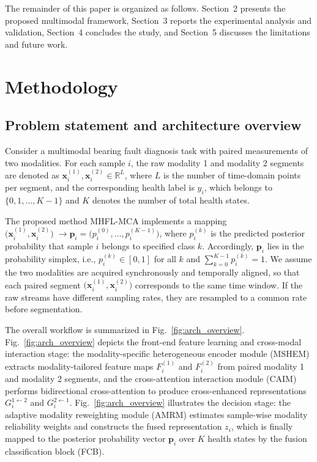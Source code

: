 \documentclass[a4paper]{cas-sc}
\begin{document}
The remainder of this paper is organized as follows.
Section~2 presents the proposed multimodal framework, Section~3 reports the experimental analysis and validation, Section~4 concludes the study, and Section~5 discusses the limitations and future work.

\section{Methodology}
\subsection{Problem statement and architecture overview}

Consider a multimodal bearing fault diagnosis task with paired measurements of two modalities. For each sample \(i\), the raw modality 1 and modality 2 segments are denoted as
$\mathbf{x}_i^{(1)}, \mathbf{x}_i^{(2)} \in \mathbb{R}^{L}$, 
where \(L\) is the number of time-domain points per segment, and the corresponding health label is $y_i$, which belongs to $\{0,1,\dots,K-1\}$ and $K$ denotes the number of total health states.

The proposed method MHFL-MCA implements a mapping
$\big(\mathbf{x}_i^{(1)}, \mathbf{x}_i^{(2)}\big) \;\rightarrow \mathbf{p}_i = \big(p_i^{(0)}, \dots, p_i^{(K-1)}\big)$, where \(p_i^{(k)}\) is the predicted posterior probability that sample \(i\) belongs to specified class \(k\). Accordingly, $\mathbf{p}_i$ lies in the probability simplex, i.e.,
$p_i^{(k)}\in[0,1]$ for all $k$ and $\sum_{k=0}^{K-1} p_i^{(k)}=1$. We assume the two modalities are acquired synchronously and temporally aligned, so that each paired segment
$\big(\mathbf{x}_i^{(1)}, \mathbf{x}_i^{(2)}\big)$ corresponds to the same time window. If the raw streams have different sampling rates, they are resampled to a common rate before segmentation. 

The overall workflow is summarized in Fig.~\ref{fig:arch_overview}. Fig.~\ref{fig:arch_overview} depicts the front-end feature learning and cross-modal interaction stage: the modality-specific heterogeneous encoder module (MSHEM) extracts modality-tailored feature maps $F_i^{(1)}$ and $F_i^{(2)}$ from paired modality 1 and modality 2 segments, and the cross-attention interaction module (CAIM) performs bidirectional cross-attention to produce cross-enhanced representations $G_i^{1\leftarrow 2}$ and $G_i^{2\leftarrow 1}$. 
Fig.~\ref{fig:arch_overview} illustrates the decision stage: the adaptive modality reweighting module (AMRM) estimates sample-wise modality reliability weights and constructs the fused representation $z_i$, which is finally mapped to the posterior probability vector $\mathbf{p}_i$ over $K$ health states by the fusion classification block (FCB).
\end{document}

